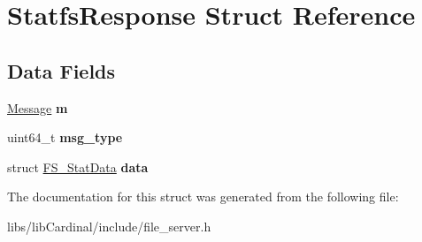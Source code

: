 \hypertarget{structStatfsResponse}{}\section{Statfs\+Response Struct Reference}
\label{structStatfsResponse}
\subsection*{Data Fields}
\begin{DoxyCompactItemize}
\item 
\hyperlink{structMessage}{Message} {\bfseries m}\hypertarget{structStatfsResponse_ad9a925a21ec4aaad0dc6c468368a800d}{}\label{structStatfsResponse_ad9a925a21ec4aaad0dc6c468368a800d}

\item 
uint64\+\_\+t {\bfseries msg\+\_\+type}\hypertarget{structStatfsResponse_a9f493a13d09e8c3b58ea36acc2e0c205}{}\label{structStatfsResponse_a9f493a13d09e8c3b58ea36acc2e0c205}

\item 
struct \hyperlink{structFS__StatData}{F\+S\+\_\+\+Stat\+Data} {\bfseries data}\hypertarget{structStatfsResponse_adc1ad271cc32f2efc267114b6014a3df}{}\label{structStatfsResponse_adc1ad271cc32f2efc267114b6014a3df}

\end{DoxyCompactItemize}


The documentation for this struct was generated from the following file\+:\begin{DoxyCompactItemize}
\item 
libs/lib\+Cardinal/include/file\+\_\+server.\+h\end{DoxyCompactItemize}
